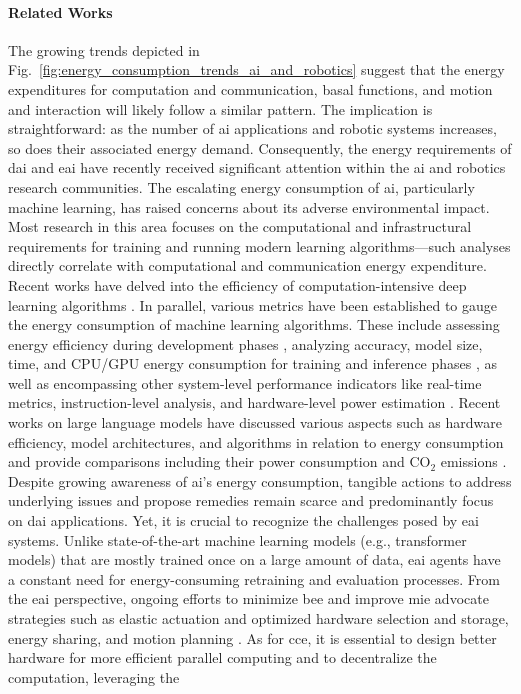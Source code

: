 \documentclass[12pt]{article}
\begin{document}
\paragraph*{Related Works}
The growing trends depicted in Fig.~\ref{fig:energy_consumption_trends_ai_and_robotics} suggest that the energy expenditures for computation and communication, basal functions, and motion and interaction will likely follow a similar pattern. The implication is straightforward: as the number of \ac{ai} applications and robotic systems increases, so does their associated energy demand. Consequently, the energy requirements of \ac{dai} and \ac{eai} have recently received significant attention within the \ac{ai} and robotics research communities. The escalating energy consumption of \ac{ai}, particularly machine learning, has raised concerns about its adverse environmental impact. Most research in this area focuses on the computational and infrastructural requirements for training and running modern learning algorithms---such analyses directly correlate with computational and communication energy expenditure. Recent works have delved into the efficiency of computation-intensive deep learning algorithms \cite{Schwartz2019GreenAI,Vinuesa2020roleartificialintelligence,Strubell2019EnergyPolicyConsiderations,Luccioni2023EstimatingCarbonFootprint}. In parallel, various metrics have been established to gauge the energy consumption of machine learning algorithms. These include assessing energy efficiency during development phases \cite{Zhou2020HULKEnergyEfficiency}, analyzing accuracy, model size, time, and CPU/GPU energy consumption for training and inference phases \cite{Dalgren2019GreenMLmethodology}, as well as encompassing other system-level performance indicators like real-time metrics, instruction-level analysis, and hardware-level power estimation \cite{GarciaMartin2019Estimationenergyconsumption}. Recent works on large language models have discussed various aspects such as hardware efficiency, model architectures, and algorithms in relation to energy consumption \cite{Vries2023growingenergyfootprint} and provide comparisons including their power consumption and CO$_2$ emissions \cite{SIHCAI2023ArtificialIntelligenceIndex}. Despite growing awareness of \ac{ai}'s energy consumption, tangible actions to address underlying issues and propose remedies remain scarce and predominantly focus on \ac{dai} applications. Yet, it is crucial to recognize the challenges posed by \ac{eai} systems. Unlike state-of-the-art machine learning models (e.g., transformer models) that are mostly trained once on a large amount of data, \ac{eai} agents have a constant need for energy-consuming retraining and evaluation processes. From the \ac{eai} perspective, ongoing efforts to minimize \ac{bee} and improve \ac{mie} advocate strategies such as elastic actuation and optimized hardware selection and storage, energy sharing, and motion planning \cite{CUT2015Smoothrobotmovements, Mohammed2014MinimizingEnergyConsumption, Chemnitz2011Analyzingenergyconsumption,Vasarhelyi2023OverviewEnergiesProblems,Sekala2024SelectedIssuesMethods}. As for \ac{cce}, it is essential to design better hardware for more efficient parallel computing and to decentralize the computation, leveraging the 
\end{document}
